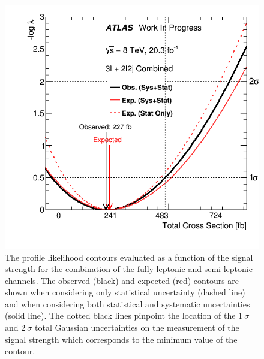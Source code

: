 
\begin{figure}[ht!]
\centering
\includegraphics[width=.95\textwidth]{figures/combination/interval_comb.png}
\caption{The profile likelihood contours evaluated as a function of the signal strength
for the combination of the fully-leptonic and semi-leptonic channels. 
The observed (black) and expected (red) contours are shown when considering only statistical uncertainty (dashed line) and when considering both statistical and systematic uncertainties (solid line).
The dotted black
lines pinpoint the location of the $1~\sigma$ and $2~\sigma$ total Gaussian uncertainties
on the measurement of the signal strength which corresponds to the minimum value of the contour.}
\label{fig:stat_measurement_interval_combination}
\end{figure}


